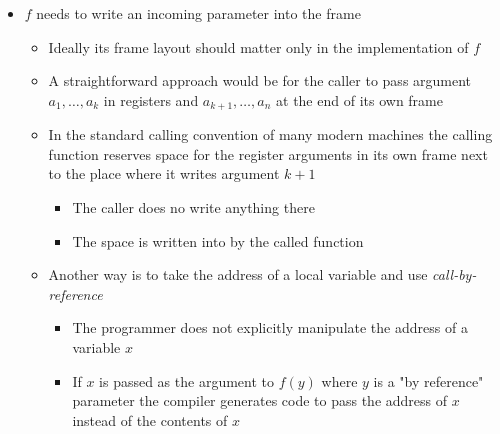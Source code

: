 \documentclass[11pt]{article}
\begin{document}
\begin{itemize}
\item \(f\) needs to write an incoming parameter into the frame 
\begin{itemize}
\item Ideally its frame layout should matter only in the implementation of \(f\)
\item A straightforward approach would be for the caller to pass argument \(a_1, \dots, a_k\) in registers and \(a_{k+1}, \dots, a_n\) at the end of its own frame
\item In the standard calling convention of many modern machines the calling function reserves space for the register arguments in its own frame next to the place where it writes argument \(k+1\)
\begin{itemize}
\item The caller does no write anything there
\item The space is written into by the called function
\end{itemize}
\item Another way is to take the address of a local variable and use \emph{call-by-reference}
\begin{itemize}
\item The programmer does not explicitly manipulate the address of a variable \(x\)
\item If \(x\) is passed as the argument to \(f(y)\) where \(y\) is a "by reference" parameter the compiler generates code to pass the address of \(x\) instead of the contents of \(x\)
\end{itemize}
\end{itemize}
\end{itemize}
\end{document}

